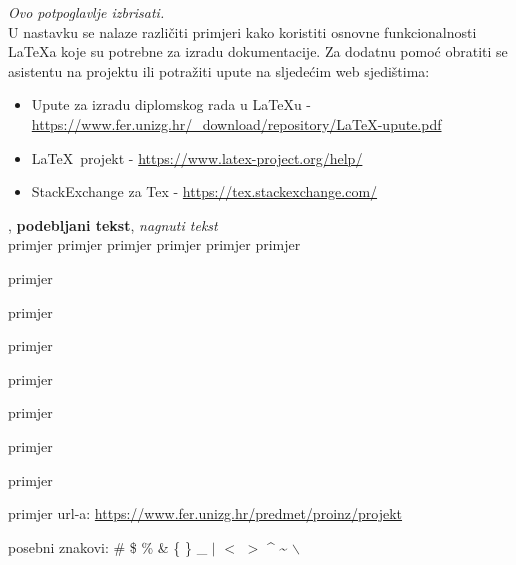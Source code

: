 		\textit{Ovo potpoglavlje izbrisati.}\\

		U nastavku se nalaze različiti primjeri kako koristiti osnovne funkcionalnosti \LaTeX a koje su potrebne za izradu dokumentacije. Za dodatnu pomoć obratiti se asistentu na projektu ili potražiti upute na sljedećim web sjedištima:
		\begin{itemize}
			\item Upute za izradu diplomskog rada u \LaTeX u - \url{https://www.fer.unizg.hr/_download/repository/LaTeX-upute.pdf}
			\item \LaTeX\ projekt - \url{https://www.latex-project.org/help/}
			\item StackExchange za Tex - \url{https://tex.stackexchange.com/}\\
		
		\end{itemize} 	


		
		\noindent {}, \textbf{podebljani tekst}, 	\textit{nagnuti tekst}\\
		\noindent \normalsize primjer \large primjer \Large primjer \LARGE {primjer} \huge {primjer} \Huge primjer \normalsize
				
		\begin{packed_item}
			
			\item  primjer
			\item  primjer
			\item  primjer
			\item[] \begin{packed_enum}
				\item primjer
				\item[] \begin{packed_enum}
					\item[1.a] primjer
					\item[b] primjer
				\end{packed_enum}
				\item primjer
			\end{packed_enum}
			
		\end{packed_item}
		
		\noindent primjer url-a: \url{https://www.fer.unizg.hr/predmet/proinz/projekt}
		
		\noindent posebni znakovi: \# \$ \% \& \{ \} \_ 
		$|$ $<$ $>$ 
		\^{} 
		\~{} 
		$\backslash$ 
		
